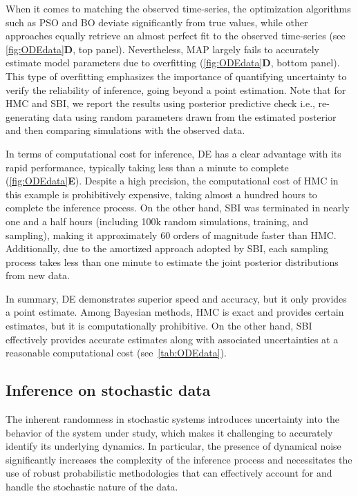 \documentclass[12pt]{article}
\begin{document}
When it comes to matching the observed time-series, the optimization algorithms such as PSO and BO deviate significantly from true values, while other approaches equally retrieve an almost perfect fit to the observed time-series (see \autoref{fig:ODEdata}\textbf{D}, top panel). Nevertheless, MAP largely fails to accurately estimate model parameters due to overfitting (\autoref{fig:ODEdata}\textbf{D}, bottom panel). This type of overfitting emphasizes the importance of quantifying uncertainty to verify the reliability of inference, going beyond a point estimation. Note that for HMC and SBI, we report the results using posterior predictive check i.e., re-generating data using random parameters drawn from the estimated posterior and then comparing simulations with the observed data.

In terms of computational cost for inference, DE has a clear advantage with its rapid performance, typically taking less than a minute to complete (\autoref{fig:ODEdata}\textbf{E}). Despite a high precision, the computational cost of HMC in this example is prohibitively expensive, taking almost a hundred hours to complete the inference process. On the other hand, SBI was terminated in nearly one and a half hours (including 100k random simulations, training, and sampling), making it approximately 60 orders of magnitude faster than HMC. Additionally, due to the amortized approach adopted by SBI, each sampling process takes less than one minute to estimate the joint posterior distributions from new data. 

In summary, DE demonstrates superior speed and accuracy, but it only provides a point estimate. Among Bayesian methods, HMC is exact and provides certain estimates, but it is computationally prohibitive. On the other hand, SBI effectively provides accurate estimates along with associated uncertainties at a reasonable computational cost (see~\autoref{tab:ODEdata}). 


\subsection{Inference on stochastic data}

The inherent randomness in stochastic systems introduces uncertainty into the behavior of the system under study, which makes it challenging to accurately identify its underlying dynamics. In particular, the presence of dynamical noise significantly increases the complexity of the inference process and necessitates the use of robust probabilistic methodologies that can effectively account for and handle the stochastic nature of the data. 
\end{document}
